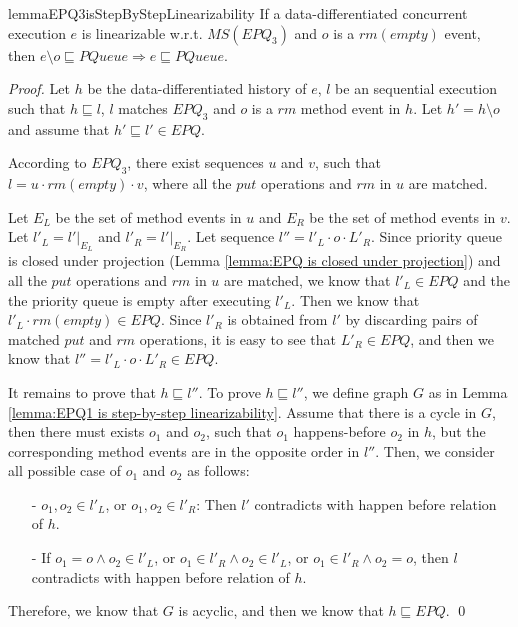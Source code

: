 \begin{restatable}{lemma}{EPQ3isStepByStepLinearizability}
\label{lemma:EPQ3 is step-by-step linearizability}
If a data-differentiated concurrent execution $e$ is linearizable w.r.t. $\textit{MS}(\textit{EPQ}_3)$ and $o$ is a $\textit{rm}(\textit{empty})$ event, then $e \setminus o \sqsubseteq \textit{PQueue} \Rightarrow e \sqsubseteq \textit{PQueue}$.
\end{restatable}

\begin {proof}
Let $h$ be the data-differentiated history of $e$, $l$ be an sequential execution such that $h \sqsubseteq l$, $l$ matches $\textit{EPQ}_3$ and $o$ is a $\textit{rm}$ method event in $h$. Let $h'=h \setminus o$ and assume that $h' \sqsubseteq l' \in \textit{EPQ}$.

According to $\textit{EPQ}_3$, there exist sequences $u$ and $v$, such that $l=u \cdot \textit{rm}(\textit{empty}) \cdot v$, where all the $\textit{put}$ operations and $\textit{rm}$ in $u$ are matched.

Let $E_L$ be the set of method events in $u$ and $E_R$ be the set of method events in $v$. Let $l'_L = l' \vert_{E_L}$ and $l'_R = l' \vert_{E_R}$. Let sequence $l'' = l'_L \cdot o \cdot L'_R$. Since priority queue is closed under projection (Lemma \ref{lemma:EPQ is closed under projection}) and all the $\textit{put}$ operations and $\textit{rm}$ in $u$ are matched, we know that $l'_L \in \textit{EPQ}$ and the the priority queue is empty after executing $l'_L$. Then we know that $l'_L \cdot \textit{rm}(\textit{empty}) \in \textit{EPQ}$. Since $l'_R$ is obtained from $l'$ by discarding pairs of matched $\textit{put}$ and $\textit{rm}$ operations, it is easy to see that $L'_R \in \textit{EPQ}$, and then we know that $l'' = l'_L \cdot o \cdot L'_R \in \textit{EPQ}$.

It remains to prove that $h \sqsubseteq l''$. To prove $h \sqsubseteq l''$, we define graph $G$ as in Lemma \ref{lemma:EPQ1 is step-by-step linearizability}. Assume that there is a cycle in $G$, then there must exists $o_1$ and $o_2$, such that $o_1$ happens-before $o_2$ in $h$, but the corresponding method events are in the opposite order in $l''$. Then, we consider all possible case of $o_1$ and $o_2$ as follows:

\begin{itemize}
\setlength{\itemsep}{0.5pt}
\item[-] $o_1,o_2 \in l'_L$, or $o_1,o_2 \in l'_R$: Then $l'$ contradicts with happen before relation of $h$.

\item[-] If $o_1=o \wedge o_2 \in l'_L$, or $o_1 \in l'_R \wedge o_2 \in l'_L$, or $o_1 \in l'_R \wedge o_2 = o$, then $l$ contradicts with happen before relation of $h$.
\end{itemize}

Therefore, we know that $G$ is acyclic, and then we know that $h \sqsubseteq \textit{EPQ}$. \qed
\end {proof}

